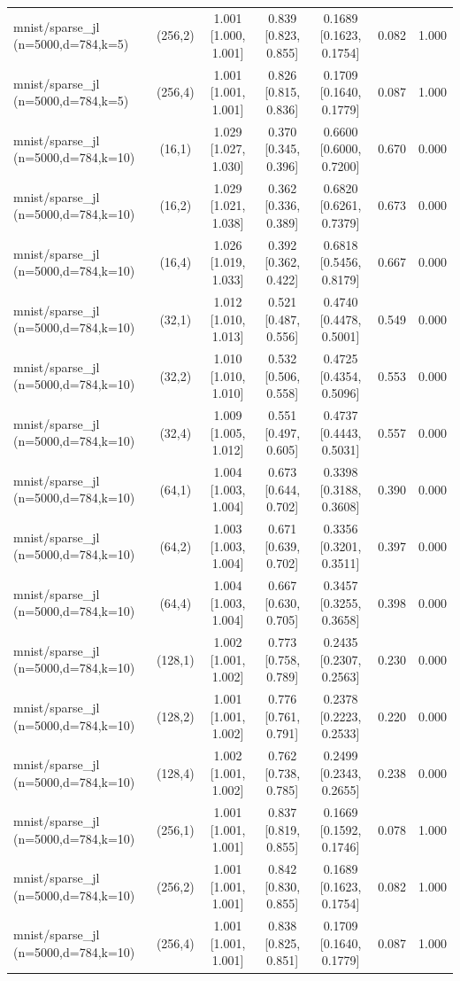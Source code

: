 \begin{tabular}{lcccccc}
mnist/sparse\_jl (n=5000,d=784,k=5) & (256,2) & 1.001 [1.000, 1.001] & 0.839 [0.823, 0.855] & 0.1689 [0.1623, 0.1754] & 0.082 & 1.000 \\
mnist/sparse\_jl (n=5000,d=784,k=5) & (256,4) & 1.001 [1.001, 1.001] & 0.826 [0.815, 0.836] & 0.1709 [0.1640, 0.1779] & 0.087 & 1.000 \\
mnist/sparse\_jl (n=5000,d=784,k=10) & (16,1) & 1.029 [1.027, 1.030] & 0.370 [0.345, 0.396] & 0.6600 [0.6000, 0.7200] & 0.670 & 0.000 \\
mnist/sparse\_jl (n=5000,d=784,k=10) & (16,2) & 1.029 [1.021, 1.038] & 0.362 [0.336, 0.389] & 0.6820 [0.6261, 0.7379] & 0.673 & 0.000 \\
mnist/sparse\_jl (n=5000,d=784,k=10) & (16,4) & 1.026 [1.019, 1.033] & 0.392 [0.362, 0.422] & 0.6818 [0.5456, 0.8179] & 0.667 & 0.000 \\
mnist/sparse\_jl (n=5000,d=784,k=10) & (32,1) & 1.012 [1.010, 1.013] & 0.521 [0.487, 0.556] & 0.4740 [0.4478, 0.5001] & 0.549 & 0.000 \\
mnist/sparse\_jl (n=5000,d=784,k=10) & (32,2) & 1.010 [1.010, 1.010] & 0.532 [0.506, 0.558] & 0.4725 [0.4354, 0.5096] & 0.553 & 0.000 \\
mnist/sparse\_jl (n=5000,d=784,k=10) & (32,4) & 1.009 [1.005, 1.012] & 0.551 [0.497, 0.605] & 0.4737 [0.4443, 0.5031] & 0.557 & 0.000 \\
mnist/sparse\_jl (n=5000,d=784,k=10) & (64,1) & 1.004 [1.003, 1.004] & 0.673 [0.644, 0.702] & 0.3398 [0.3188, 0.3608] & 0.390 & 0.000 \\
mnist/sparse\_jl (n=5000,d=784,k=10) & (64,2) & 1.003 [1.003, 1.004] & 0.671 [0.639, 0.702] & 0.3356 [0.3201, 0.3511] & 0.397 & 0.000 \\
mnist/sparse\_jl (n=5000,d=784,k=10) & (64,4) & 1.004 [1.003, 1.004] & 0.667 [0.630, 0.705] & 0.3457 [0.3255, 0.3658] & 0.398 & 0.000 \\
mnist/sparse\_jl (n=5000,d=784,k=10) & (128,1) & 1.002 [1.001, 1.002] & 0.773 [0.758, 0.789] & 0.2435 [0.2307, 0.2563] & 0.230 & 0.000 \\
mnist/sparse\_jl (n=5000,d=784,k=10) & (128,2) & 1.001 [1.001, 1.002] & 0.776 [0.761, 0.791] & 0.2378 [0.2223, 0.2533] & 0.220 & 0.000 \\
mnist/sparse\_jl (n=5000,d=784,k=10) & (128,4) & 1.002 [1.001, 1.002] & 0.762 [0.738, 0.785] & 0.2499 [0.2343, 0.2655] & 0.238 & 0.000 \\
mnist/sparse\_jl (n=5000,d=784,k=10) & (256,1) & 1.001 [1.001, 1.001] & 0.837 [0.819, 0.855] & 0.1669 [0.1592, 0.1746] & 0.078 & 1.000 \\
mnist/sparse\_jl (n=5000,d=784,k=10) & (256,2) & 1.001 [1.001, 1.001] & 0.842 [0.830, 0.855] & 0.1689 [0.1623, 0.1754] & 0.082 & 1.000 \\
mnist/sparse\_jl (n=5000,d=784,k=10) & (256,4) & 1.001 [1.001, 1.001] & 0.838 [0.825, 0.851] & 0.1709 [0.1640, 0.1779] & 0.087 & 1.000 \\
\bottomrule
\end{tabular}

